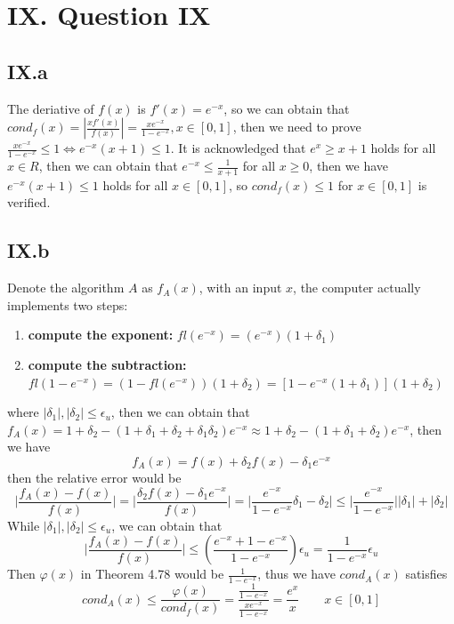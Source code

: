 \documentclass[a4paper]{article}
\begin{document}
\section*{IX. Question IX}

\subsection*{IX.a}

The deriative of $f(x)$ is $f'(x)=e^{-x}$, so we can obtain that $cond_f(x)=|\frac{xf'(x)}{f(x)}|=\frac{xe^{-x}}{1-e^{-x}},x\in[0,1]$, then we need to prove $\frac{xe^{-x}}{1-e^{-x}}\leq 1\iff e^{-x}(x+1)\leq 1$.
It is acknowledged that $e^x\geq x+1$ holds for all $x\in R$, then we can obtain that $e^{-x}\leq \frac{1}{x+1}$ for all $x\geq 0$, then we have $e^{-x}(x+1)\leq 1$ holds for all $x\in[0,1]$, so $cond_f(x)\leq 1$ for $x\in[0,1]$ is verified.

\subsection*{IX.b}

Denote the algorithm $A$ as $f_A(x)$, with an input $x$, the computer actually implements two steps:
\begin{enumerate}
  \item \textbf{compute the exponent:} $fl(e^{-x})=(e^{-x})(1+\delta_1)$
  \item \textbf{compute the subtraction:} $fl(1-e^{-x})=(1-fl(e^{-x}))(1+\delta_2)=[1-e^{-x}(1+\delta_1)](1+\delta_2)$
\end{enumerate}
where $|\delta_1|,|\delta_2|\leq \epsilon_u$, then we can obtain that $f_A(x)=1+\delta_2-(1+\delta_1+\delta_2+\delta_1\delta_2)e^{-x}\approx 1+\delta_2-(1+\delta_1+\delta_2)e^{-x}$, then we have
\begin{equation}
  f_A(x)=f(x)+\delta_2f(x)-\delta_1e^{-x}
\end{equation}
then the relative error would be 
\begin{equation}
  \big|\frac{f_A(x)-f(x)}{f(x)}\big|=\big|\frac{\delta_2f(x)-\delta_1e^{-x}}{f(x)}\big|=\big|\frac{e^{-x}}{1-e^{-x}}\delta_1-\delta_2\big|\leq \big|\frac{e^{-x}}{1-e^{-x}}\big|\big|\delta_1\big|+\big|\delta_2\big|
\end{equation}
While $|\delta_1|,|\delta_2|\leq \epsilon_u$, we can obtain that
\begin{equation}
  \big|\frac{f_A(x)-f(x)}{f(x)}\big|\leq (\frac{e^{-x}+1-e^{-x}}{1-e^{-x}})\epsilon_u=\frac{1}{1-e^{-x}}\epsilon_u
\end{equation}
Then $\varphi(x)$ in Theorem 4.78 would be $\frac{1}{1-e^{-x}}$, thus we have $cond_A(x)$ satisfies
\begin{equation}
  cond_A(x)\leq \frac{\varphi(x)}{cond_f(x)}=\frac{\frac{1}{1-e^{-x}}}{\frac{xe^{-x}}{1-e^{-x}}}=\frac{e^x}{x} \qquad x\in[0,1]
\end{equation}
\end{document}
